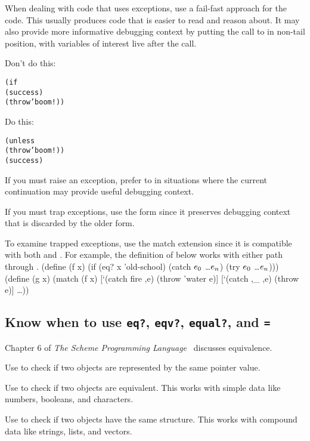 \documentclass[letterpaper,11pt,twoside,final]{article}
\begin{document}
When dealing with code that uses exceptions, use a fail-fast approach
for the code. This usually produces code that is easier to read and
reason about.
It may also provide more informative debugging context by putting
the call to  in non-tail position, with variables of
interest live after the call.

Don't do this:
\antipar
\begin{alltt}
(if 
    (success)
    (throw 'boom!))
\end{alltt}

Do this:
\antipar
\begin{alltt}
(unless 
  (throw 'boom!))
(success)
\end{alltt}

If you must raise an exception, prefer  to  in
situations where the current continuation may provide useful debugging
context.

If you must trap exceptions, use the  form since it preserves
debugging context that is discarded by the older  form.

To examine trapped exceptions, use the  match extension since
it is compatible with both  and .
For example, the definition of  below works with either
path through .
\codebegin
(define (f x)
  (if (eq? x 'old-school)
      (catch \(e\sb{0}\) \ldots \(e\sb{n}\))
      (try \(e\sb{0}\) \ldots \(e\sb{n}\))))
(define (g x)
  (match (f x)
    [`(catch fire ,e) (throw 'water e)]
    [`(catch ,_ ,e) (throw e)]
    \ldots))
\codeend

\subsection* {Know when to use \texttt{eq?}, \texttt{eqv?},
  \texttt{equal?}, and \texttt{=}}

Chapter 6 of \emph{The Scheme Programming
  Language}~\cite{the-scheme-programming-language} discusses
equivalence.

Use  to check if two objects are represented by the same
pointer value.

Use  to check if two objects are equivalent. This works
with simple data like numbers, booleans, and characters.

Use  to check if two objects have the same
structure. This works with compound data like strings, lists, and
vectors.
\end{document}
